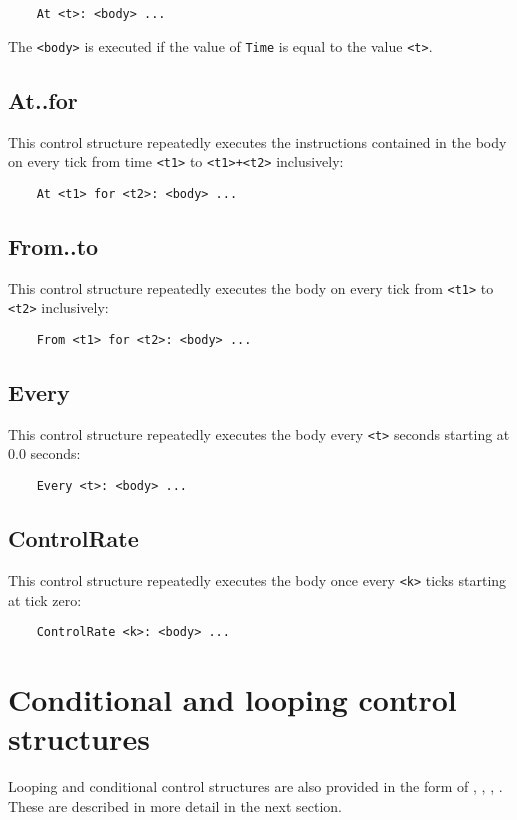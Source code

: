 \begin{verbatim}
    At <t>: <body> ...
\end{verbatim}

The \verb|<body>| is executed if the value of \verb|Time| is equal to
the value \verb|<t>|.
 
\subsection{At..for}
This control structure repeatedly executes the instructions contained
in the body on every tick from time \verb|<t1>| to \verb|<t1>+<t2>|
inclusively:

\begin{verbatim}
    At <t1> for <t2>: <body> ...
\end{verbatim}

\subsection{From..to}
This control structure repeatedly executes the body on every tick from
\verb|<t1>| to \verb|<t2>| inclusively:

\begin{verbatim}
    From <t1> for <t2>: <body> ...
\end{verbatim}

\subsection{Every}
This control structure repeatedly executes the body every \verb|<t>|
seconds starting at 0.0 seconds:

\begin{verbatim}
    Every <t>: <body> ...
\end{verbatim}

\subsection{ControlRate}
This control structure repeatedly executes the body once every
\verb|<k>| ticks starting at tick zero:

\begin{verbatim}
    ControlRate <k>: <body> ...
\end{verbatim}

\section{Conditional and looping control structures}
Looping and conditional control structures are also provided in the form
of , , ,
. These are described in more detail in the
next section.

